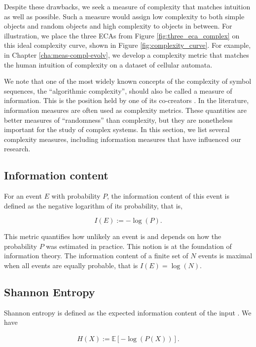 Despite these drawbacks, we seek a measure of complexity that matches intuition
as well as possible. Such a measure would assign low complexity to both simple
objects and random objects and high complexity to objects in between. For
illustration, we place the three \acp{ECA} from Figure
\ref{fig:three_eca_complex} on this ideal complexity curve, shown in Figure
\ref{fig:complexity_curve}. For example, in Chapter \ref{cha:meas-compl-evolv},
we develop a complexity metric that matches the human intuition of complexity on a
dataset of cellular automata.

We note that one of the most widely known concepts of the complexity of symbol
sequences, the ``algorithmic complexity'', should also be called a measure of
information. This is the position held by one of its co-creators
\parencite{chaitinInformationRandomnessIncompleteness1990}. In the literature,
information measures are often used as complexity metrics. These quantities
are better measures of ``randomness'' than complexity, but they are nonetheless
important for the study of complex systems. In this section, we list several
complexity measures, including information measures that have influenced our
research.

\subsection{Information content}
For an event $E$ with probability $P$, the information content of this event is
defined as the negative logarithm of its probability, that is,

\begin{equation}
  I(E) :=  -\log(P).
\end{equation}

This metric quantifies how unlikely an event is and depends on how the
probability $P$ was estimated in practice. This notion is at the foundation of
information theory. The information content of a finite set of $N$ events is maximal 
when all events are equally probable, that is $I(E) = \log(N)$.

\subsection{Shannon Entropy}
Shannon entropy is defined as the expected information content of the input
\parencite{shannonMathematicalTheoryCommunication1975}. We have

\begin{align*}
  H(X) := \mathbb{E}[-\log(P(X))].
\end{align*}

